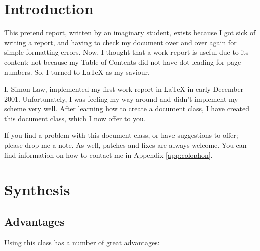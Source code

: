 \documentclass{uw-wkrpt}
\begin{document}
\mainmatter

\section{Introduction}\label{sec:intro}
This pretend report, written by an imaginary student,
exists because I got sick of writing a report,
and having to check my document over and over again for simple
formatting errors.  Now, I thought that a work report is useful
due to its content; not because my Table of Contents did not have dot
leading for page numbers.  So, I turned to \LaTeX{} as my saviour.

I, Simon Law, implemented my first work report in \LaTeX{} in early
December 2001.  Unfortunately, I was feeling my way around and didn't
implement my scheme very well.  After learning how to create a
document class, I have created this document class, which I now offer 
to you.

If you find a problem with this document class, or have suggestions to
offer; please drop me a note.  As well, patches and fixes are always
welcome.  You can find information on how to contact me in Appendix 
\ref{app:colophon}.

\section{Synthesis}

\subsection{Advantages}
Using this class has a number of great advantages:
\end{document}
